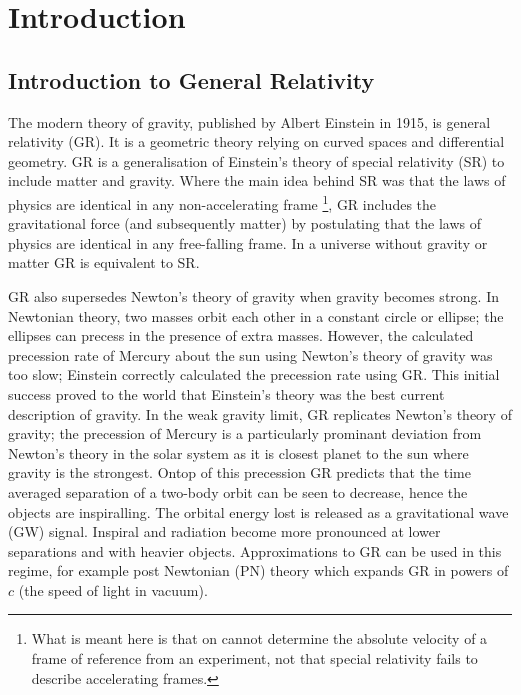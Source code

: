 

\section{Introduction}
\subsection{Introduction to General Relativity}

The modern theory of gravity, published by Albert Einstein in 1915, is general
relativity (GR). It is a geometric theory relying on curved spaces and differential
geometry. GR is a generalisation of Einstein's theory of special relativity (SR)
to include matter and gravity. Where the main idea behind SR was that the laws of
physics are identical in any non-accelerating frame
\footnote{What is meant here is that on cannot determine the absolute velocity of a
frame of reference from an experiment, not that special relativity fails to describe
accelerating frames. },
GR includes the gravitational
force (and subsequently matter) by postulating that the laws of physics are identical
in any free-falling frame. In a universe without gravity or matter GR is equivalent
to SR.

GR also supersedes Newton's theory of gravity when gravity becomes strong. In Newtonian theory, two masses orbit each other in a constant circle or ellipse; the ellipses can precess in the presence of extra masses. However, the calculated precession rate of Mercury about the sun using Newton's theory of gravity was too slow; Einstein correctly calculated the precession rate using GR. This initial success proved to the world that Einstein's theory was the best current description of gravity. In the weak gravity limit, GR replicates Newton's theory of gravity; the precession of Mercury is a particularly prominant deviation from Newton's theory in the solar system as it is closest planet to the sun where gravity is the strongest. Ontop of this precession GR predicts that the time averaged separation of a two-body orbit can be seen to decrease, hence the objects are inspiralling. The orbital energy lost is released as a gravitational wave (GW) signal. Inspiral and radiation become more pronounced at lower separations and with heavier objects. Approximations to GR can be used in this regime, for example post Newtonian (PN) theory which expands GR in powers of $c$ (the speed of light in vacuum).

